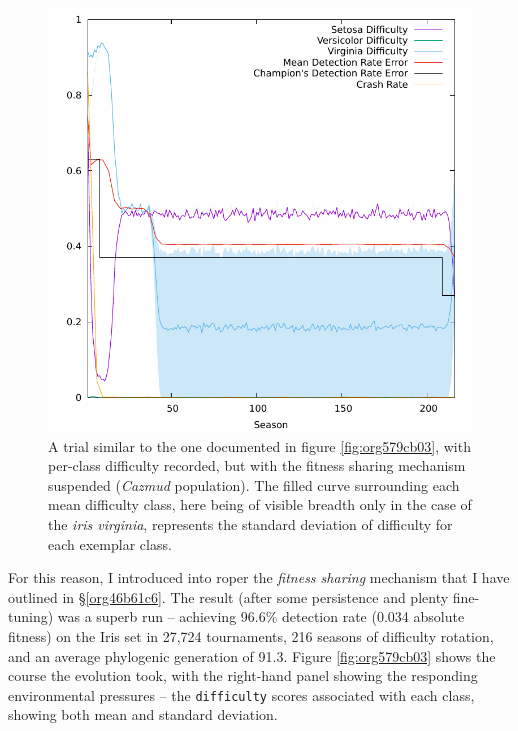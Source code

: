 \documentclass[12pt,glossary]{dalthesis}
\begin{document}
\begin{figure}[htbp]
\centering
\includegraphics[width=.9\linewidth]{../images/plots/nosharing.pdf}
\caption{\label{fig:orgf4a4d52}
A trial similar to the one documented in figure \ref{fig:org579cb03}, with per-class difficulty recorded, but with the fitness sharing mechanism suspended (\emph{Cazmud} population). The filled curve surrounding each mean difficulty class, here being of visible breadth only in the case of the \emph{iris virginia}, represents the standard deviation of difficulty for each exemplar class.}
\end{figure}

For this reason, I introduced into \gls{roper} the \emph{fitness sharing} mechanism 
that I have outlined in \S \ref{org46b61c6}. 
 The result (after some persistence and plenty fine-tuning) was a superb run --
achieving 96.6\% detection rate (0.034 absolute fitness) on the Iris set in
27,724 tournaments, 216 seasons of difficulty rotation, and an average
phylogenic generation of 91.3. Figure \ref{fig:org579cb03} shows the course the
evolution took, with the right-hand panel showing the responding environmental
pressures -- the \texttt{difficulty} scores associated with each class, showing both
mean and standard deviation.
\end{document}
